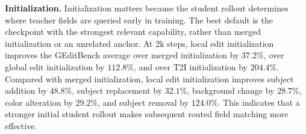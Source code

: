 \noindent\textbf{Initialization.}
Initialization matters because the student rollout determines where teacher fields are queried early in training. The best default is the checkpoint with the strongest relevant capability, rather than merged initialization or an unrelated anchor. At $2$k steps, local edit initialization improves the GEditBench average over merged initialization by $37.2\%$, over global edit initialization by $112.8\%$, and over T2I initialization by $204.4\%$. Compared with merged initialization, local edit initialization improves subject addition by $48.8\%$, subject replacement by $32.1\%$, background change by $28.7\%$, color alteration by $29.2\%$, and subject removal by $124.0\%$. This indicates that a stronger initial student rollout makes subsequent routed field matching more effective.


